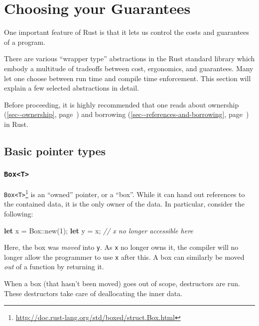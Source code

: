 \documentclass[a4paper,]{book}
\renewcommand*{\hyperref}[2][\ar]{%
  \def\ar{#2}%
  #2 (\autoref{#1}, page~\pageref{#1})}
\newenvironment{Shaded}{\begin{snugshade}}{\end{snugshade}}
\newcommand{\KeywordTok}[1]{\textcolor[rgb]{0.13,0.29,0.53}{\textbf{{#1}}}}
\newcommand{\DataTypeTok}[1]{\textcolor[rgb]{0.13,0.29,0.53}{{#1}}}
\newcommand{\DecValTok}[1]{\textcolor[rgb]{0.00,0.00,0.81}{{#1}}}
\newcommand{\CommentTok}[1]{\textcolor[rgb]{0.56,0.35,0.01}{\textit{{#1}}}}
\newcommand{\NormalTok}[1]{{#1}}
\renewcommand{\href}[2]{#2\footnote{\url{#1}}}
\begin{document}
\section{Choosing your Guarantees}\label{sec--choosing-your-guarantees}

One important feature of Rust is that it lets us control the costs and
guarantees of a program.

There are various ``wrapper type'' abstractions in the Rust standard
library which embody a multitude of tradeoffs between cost, ergonomics,
and guarantees. Many let one choose between run time and compile time
enforcement. This section will explain a few selected abstractions in
detail.

Before proceeding, it is highly recommended that one reads about
\hyperref[sec--ownership]{ownership} and
\hyperref[sec--references-and-borrowing]{borrowing} in Rust.

\subsection{Basic pointer types}\label{basic-pointer-types}

\subsubsection{\texorpdfstring{\texttt{Box\textless{}T\textgreater{}}}{Box\textless{}T\textgreater{}}}\label{boxt}

\href{http://doc.rust-lang.org/std/boxed/struct.Box.html}{\texttt{Box\textless{}T\textgreater{}}}
is an ``owned'' pointer, or a ``box''. While it can hand out references
to the contained data, it is the only owner of the data. In particular,
consider the following:

\begin{Shaded}
\begin{Highlighting}[]
\KeywordTok{let} \NormalTok{x = }\DataTypeTok{Box}\NormalTok{::new(}\DecValTok{1}\NormalTok{);}
\KeywordTok{let} \NormalTok{y = x;}
\CommentTok{// x no longer accessible here}
\end{Highlighting}
\end{Shaded}

Here, the box was \emph{moved} into \texttt{y}. As \texttt{x} no longer
owns it, the compiler will no longer allow the programmer to use
\texttt{x} after this. A box can similarly be moved \emph{out} of a
function by returning it.

When a box (that hasn't been moved) goes out of scope, destructors are
run. These destructors take care of deallocating the inner data.
\end{document}
